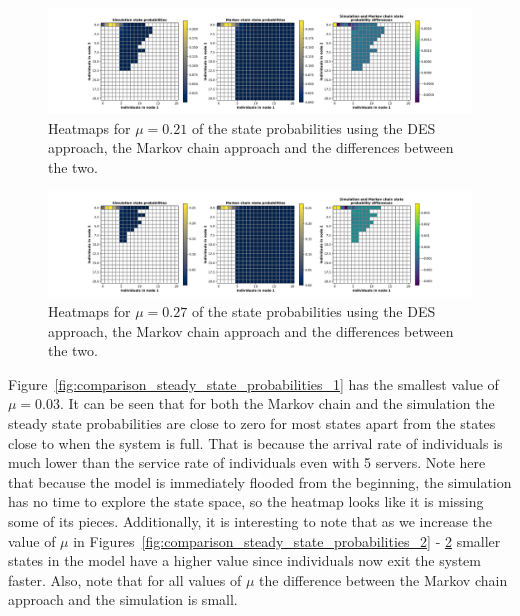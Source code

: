 \begin{figure}[H]
    \includegraphics[width=\textwidth, trim=100 10 100 10, clip]{chapters/03_queueing_model/Bin/numeric_results_and_timings/steady_state_probabilities/main_7.pdf}
    \caption{Heatmaps for \(\mu = 0.21\) of the state probabilities using the
    DES approach, the Markov chain approach and the differences between the
    two.}
    \label{fig:comparison_steady_state_probabilities_4}
\end{figure}

\begin{figure}[H]
    \includegraphics[width=\textwidth, trim=100 10 100 10, clip]{chapters/03_queueing_model/Bin/numeric_results_and_timings/steady_state_probabilities/main_9.pdf}
    \caption{Heatmaps for \(\mu = 0.27\) of the state probabilities using the
    DES approach, the Markov chain approach and the differences between the
    two.}
    \label{fig:comparison_steady_state_probabilities_5}
\end{figure}

Figure~\ref{fig:comparison_steady_state_probabilities_1} has the smallest
value of \(\mu = 0.03\).
It can be seen that for both the Markov chain and the simulation the steady
state probabilities are close to zero for most states apart from the
states close to when the system is full.
That is because the arrival rate of individuals is much lower than the service
rate of individuals even with 5 servers.
Note here that because the model is immediately flooded from the beginning, the
simulation has no time to explore the state space, so the heatmap looks like
it is missing some of its pieces.
Additionally, it is interesting to note that as we increase the value of \(\mu\)
in Figures~\ref{fig:comparison_steady_state_probabilities_2} -
\ref{fig:comparison_steady_state_probabilities_5} smaller states in the model
have a higher value since individuals now exit the system faster.
Also, note that for all values of \(\mu\) the difference between the Markov
chain approach and the simulation is small.

